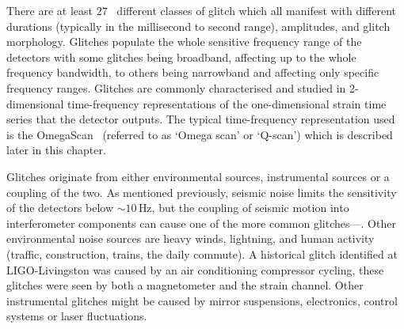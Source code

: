 
There are at least $27$~\cite{gravityspy:2023, gravityspy:2024} different classes of glitch which all manifest with different durations (typically in the millisecond to second range), amplitudes, and glitch morphology. Glitches populate the whole sensitive frequency range of the detectors with some glitches being broadband, affecting up to the whole frequency bandwidth, to others being narrowband and affecting only specific frequency ranges. Glitches are commonly characterised and studied in 2-dimensional time-frequency representations of the one-dimensional strain time series that the detector outputs. The typical time-frequency representation used is the OmegaScan~\cite{qscan:2004} (referred to as `Omega scan' or `Q-scan') which is described later in this chapter.


Glitches originate from either environmental sources, instrumental sources or a coupling of the two. As mentioned previously, seismic noise limits the sensitivity of the detectors below ${\sim}10 \, \text{Hz}$, but the coupling of seismic motion into interferometer components can cause one of the more common glitches---\scl. Other environmental noise sources are heavy winds, lightning, and human activity (traffic, construction, trains, the daily commute). A historical glitch identified at LIGO-Livingston was caused by an air conditioning compressor cycling, these glitches were seen by both a magnetometer and the \gwadj strain channel. Other instrumental glitches might be caused by mirror suspensions, electronics, control systems or laser fluctuations.


